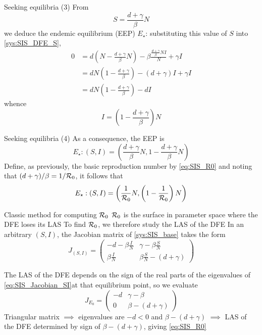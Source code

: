 \documentclass[aspectratio=43]{beamer}
\begin{document}
\begin{frame}{Seeking equilibria (3)}
From 
$$
S=\frac{d+\gamma}\beta N
$$
we deduce the endemic equilibrium (EEP) $E_\star$: substituting this value of $S$ into \eqref{sys:SIS_DFE_S},
\begin{align*}
0 &= d\left(N-\frac{d+\gamma}\beta N\right)
-\beta \frac{\frac{d+\gamma}\beta NI}{N}+\gamma I \\
&=dN\left(1-\frac{d+\gamma}{\beta}\right)
-(d+\gamma)I+\gamma I \\
&=dN\left(1-\frac{d+\gamma}{\beta}\right)-dI
\end{align*}
whence
$$
I=\left(1-\frac{d+\gamma}{\beta}\right)N
$$
\end{frame}

\begin{frame}{Seeking equilibria (4)}
As a consequence, the EEP is 
\[
E_\star :(S,I)
=\left(
  \frac{d+\gamma}\beta N, 
  1-\frac{d+\gamma}\beta N
\right)
\]
\vfill
Define, as previously, the basic reproduction number by \eqref{eq:SIS_R0} and noting that $(d+\gamma)/\beta=1/\mathcal{R}_0$, it follows that
\begin{equation}
\label{eq:SIS_EEP}
E_\star :(S,I)
=\left(
  \frac{1}{\mathcal{R}_0}N, 
  \left(1-\frac{1}{\mathcal{R}_0}\right)N
\right)
\end{equation}
\end{frame}

\begin{frame}{Classic method for computing $\mathcal{R}_0$}
$\mathcal{R}_0$ is the surface in parameter space where the DFE loses its LAS
\vfill
To find $\mathcal{R}_0$, we therefore study the LAS of the DFE
\vfill
In an arbitrary $(S,I)$, the Jacobian matrix of \eqref{sys:SIS_base} takes the form
\begin{equation}
\label{eq:SIS_Jacobian_SI}
J_{(S,I)} =
\begin{pmatrix}
-d -\beta \frac IN & \gamma-\beta\frac SN \\
\beta \frac IN & \beta\frac SN-(d+\gamma)
\end{pmatrix}
\end{equation}
\end{frame}

\begin{frame}
The LAS of the DFE depends on the sign of the real parts of the eigenvalues of \eqref{eq:SIS_Jacobian_SI}at that equilibrium point, so we evaluate
$$
J_{E_0} =
\begin{pmatrix}
-d & \gamma-\beta \\
0 & \beta-(d+\gamma)
\end{pmatrix}
$$
\vfill
Triangular matrix $\implies$ eigenvalues are $-d<0$ and $\beta-(d+\gamma)$ 
\vfill
$\implies$ LAS of the DFE determined by sign of $\beta-(d+\gamma)$, giving \eqref{eq:SIS_R0}
\end{frame}
\end{document}
